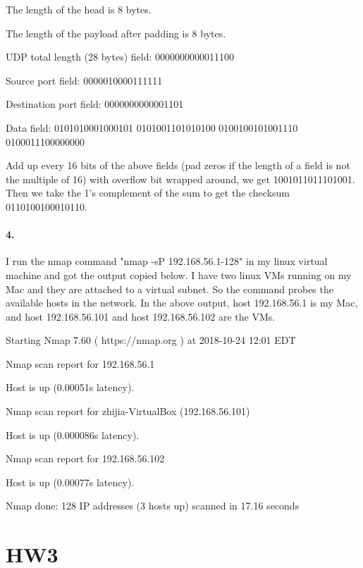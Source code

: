 \documentclass{article}
\begin{document}
The length of the head is 8 bytes.

The length of the payload after padding is 8 bytes.

UDP total length (28 bytes) field: 0000000000011100

Source port field: 0000010000111111

Destination port field: 0000000000001101

Data field: 0101010001000101 0101001101010100 0100100101001110 0100011100000000

Add up every 16 bits of the above fields (pad zeros if the length of a field is not the multiple of 16) with overflow bit wrapped around, we get 1001011011101001. Then we take the 1's complement of the sum to get the checksum 0110100100010110.

\paragraph{4.} I run the nmap command "nmap -sP 192.168.56.1-128" in my linux virtual machine and got the output copied below. I have two linux VMs running on my Mac and they are attached to a virtual subnet. So the command probes the available hosts in the network. In the above output, host 192.168.56.1 is my Mac, and host 192.168.56.101 and host 192.168.56.102 are the VMs.

Starting Nmap 7.60 ( https://nmap.org ) at 2018-10-24 12:01 EDT

Nmap scan report for 192.168.56.1

Host is up (0.00051s latency).

Nmap scan report for zhijia-VirtualBox (192.168.56.101)

Host is up (0.000086s latency).

Nmap scan report for 192.168.56.102

Host is up (0.00077s latency).

Nmap done: 128 IP addresses (3 hosts up) scanned in 17.16 seconds

\section{HW3}
\end{document}
